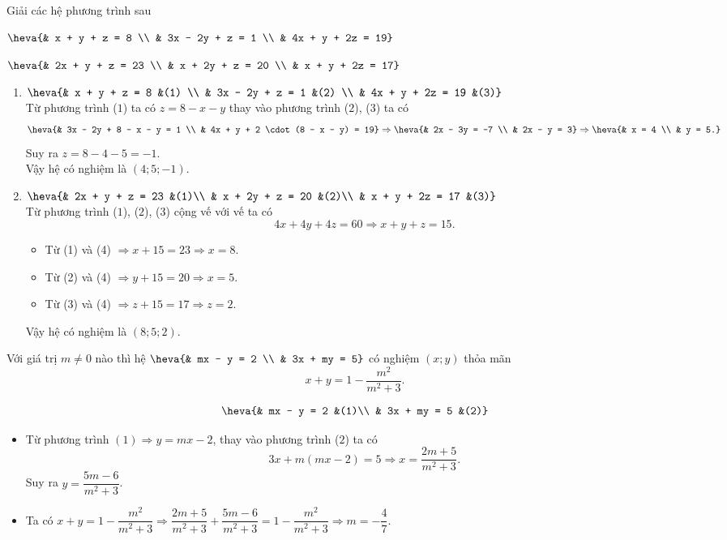 \begin{bt}%
	Giải các hệ phương trình sau	
	\begin{enumEX}{2}
	\item $\heva{& x + y + z = 8 \\ & 3x - 2y + z = 1 \\ & 4x + y + 2z = 19}$
	\item $\heva{& 2x + y + z = 23 \\ & x + 2y + z = 20 \\ & x + y + 2z = 17}$
	\end{enumEX}
	\loigiai
	{
	\begin{enumerate}
	\item $\heva{& x + y + z = 8 &(1) \\ & 3x - 2y + z = 1 &(2) \\ & 4x + y + 2z = 19 &(3)}$\\
	Từ phương trình ($1$) ta có $z = 8 - x - y$ thay vào phương trình ($2$), ($3$) ta có
	\[\heva{& 3x - 2y + 8 - x - y = 1 \\ & 4x + y + 2 \cdot (8 - x - y) = 19} \Rightarrow \heva{& 2x - 3y = -7 \\ & 2x - y = 3} \Rightarrow \heva{& x = 4 \\ & y = 5.}\]
	Suy ra $z = 8 - 4 - 5 = -1$.\\
	Vậy hệ có nghiệm là $(4; 5; -1)$.
	\item $\heva{& 2x + y + z = 23 &(1)\\ & x + 2y + z = 20 &(2)\\ & x + y + 2z = 17 &(3)}$\\
	Từ phương trình ($1$), ($2$), ($3$) cộng vế với vế ta có
	\[4x + 4y + 4z = 60 \Rightarrow x + y + z = 15. \tag{4}\]
	\begin{itemize}
	\item Từ (1) và (4) $\Rightarrow x + 15 = 23 \Rightarrow x = 8$.
	\item Từ (2) và (4) $\Rightarrow y + 15 = 20 \Rightarrow x = 5$.
	\item Từ (3) và (4) $\Rightarrow z + 15 = 17 \Rightarrow z = 2$.
	\end{itemize}
	Vậy hệ có nghiệm là $(8; 5; 2)$.
	\end{enumerate}
	}
\end{bt}
\begin{bt}%
	Với giá trị $m \neq 0$ nào thì hệ $\heva{& mx - y = 2 \\ & 3x + my = 5}$ có nghiệm $(x;y)$ thỏa mãn \[x + y = 1 - \dfrac{m^2}{m^2 + 3}.\]
	\loigiai
	{
	\[\heva{& mx - y = 2 &(1)\\ & 3x + my = 5 &(2)}\]
	\begin{itemize}
	\item Từ phương trình $(1) \Rightarrow y = mx - 2$, thay vào phương trình ($2$) ta có
	\[3x + m(m x - 2) = 5\Rightarrow x =\dfrac{2m + 5}{m^2 + 3}.\]
	Suy ra $y =\dfrac{5m - 6}{m^2 + 3}$.
	\item Ta có $x + y = 1 - \dfrac{m^2}{m^2 + 3}\Rightarrow\dfrac{2m + 5}{m^2 + 3} + \dfrac{5m - 6}{m^2 + 3}= 1 - \dfrac{m^2}{m^2 + 3}\Rightarrow m = - \dfrac{4}{7}$.
	\end{itemize}
	}
\end{bt}
